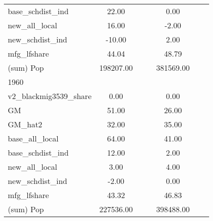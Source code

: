 \begin{table}[htbp]
\begin{tabular}{l*{2}{ccc}}
base\_schdist\_ind    &       22.00&            &            &        0.00&            &            \\
new\_all\_local       &       16.00&            &            &       -2.00&            &            \\
new\_schdist\_ind     &      -10.00&            &            &        2.00&            &            \\
mfg\_lfshare         &       44.04&            &            &       48.79&            &            \\
(sum) Pop           &   198207.00&            &            &   381569.00&            &            \\
\midrule
1960                &            &            &            &            &            &            \\
v2\_blackmig3539\_share&        0.00&            &            &        0.00&            &            \\
GM                  &       51.00&            &            &       26.00&            &            \\
GM\_hat2             &       32.00&            &            &       35.00&            &            \\
base\_all\_local      &       64.00&            &            &       41.00&            &            \\
base\_schdist\_ind    &       12.00&            &            &        2.00&            &            \\
new\_all\_local       &        3.00&            &            &        4.00&            &            \\
new\_schdist\_ind     &       -2.00&            &            &        0.00&            &            \\
mfg\_lfshare         &       43.32&            &            &       46.83&            &            \\
(sum) Pop           &   227536.00&            &            &   398488.00&            &            \\
\bottomrule
\end{tabular}
\end{table}
